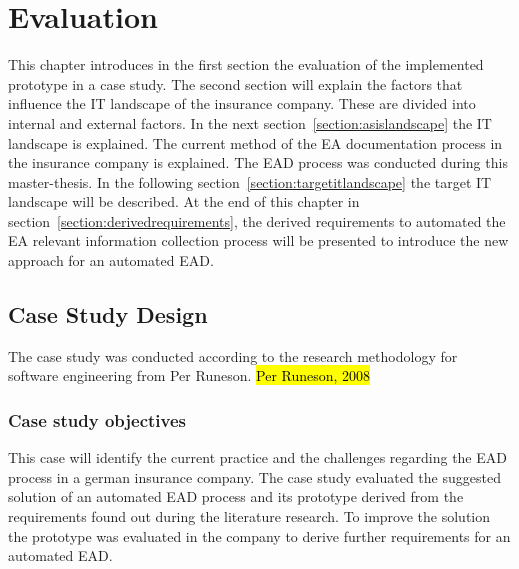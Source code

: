 \chapter{Evaluation}\label{chapter:evaluation}


This chapter introduces in the first section the evaluation of the implemented prototype in a case study. The second section will explain the factors that influence the IT landscape of the insurance company. These are divided into internal and external factors. In the next section~\ref{section:asislandscape} the IT landscape is explained. The current method of the EA documentation process in the insurance company is explained. The EAD process was conducted during this  master-thesis.
In the following section~\ref{section:targetitlandscape} the target IT landscape will be described.
At the end of this chapter in section~\ref{section:derivedrequirements}, the derived requirements to automated the EA relevant information collection process will be presented to introduce the new approach for an automated EAD.

\section{Case Study Design}\label{section:casestudy}

The case study was conducted according to the research methodology for software engineering from Per Runeson. \hl{Per Runeson, 2008}

\subsection{Case study objectives}\label{subsection:casestudyobjectives}

This case will identify the current practice and the challenges regarding the EAD process in a german insurance company. The case study evaluated the suggested solution of an automated EAD process and its prototype derived from the requirements found out during the literature research. To improve the solution the prototype was evaluated in the company to derive further requirements for an automated EAD.


